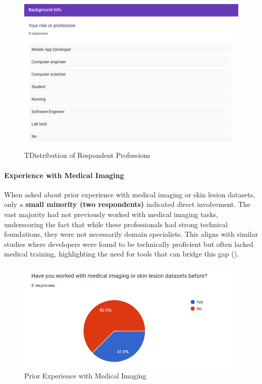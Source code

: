 \documentclass[
  12pt,
  oneside]{article}
\begin{document}
\begin{figure}

{\centering \includegraphics[width=0.8\linewidth]{technical-user-chart1} 

}

\caption{TDistribution of Respondent Professions}\label{fig:unnamed-chunk-9}
\end{figure}

\paragraph{Experience with Medical
Imaging}\label{experience-with-medical-imaging}

When asked about prior experience with medical imaging or skin lesion
datasets, only a \textbf{small minority (two respondents)} indicated
direct involvement. The vast majority had not previously worked with
medical imaging tasks, underscoring the fact that while these
professionals had strong technical foundations, they were not
necessarily domain specialists. This aligns with similar studies where
developers were found to be technically proficient but often lacked
medical training, highlighting the need for tools that can bridge this
gap ().

\begin{figure}

{\centering \includegraphics[width=1\linewidth]{technical-user-chart2} 

}

\caption{Prior Experience with Medical Imaging}\label{fig:unnamed-chunk-10}
\end{figure}
\end{document}
